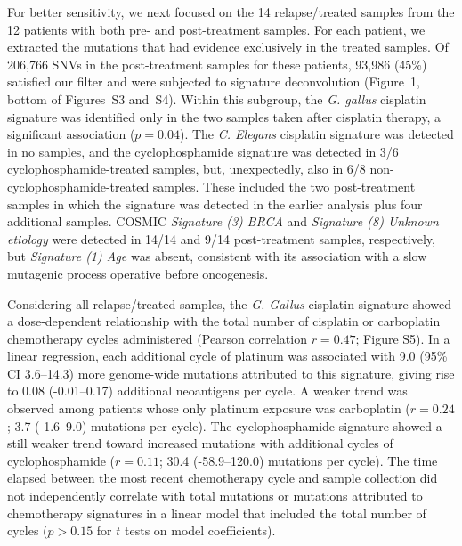 \documentclass[linenumbers]{bmcart}
\begin{document}
For better sensitivity, we next focused on the 14 relapse/treated samples from the 12 patients with both pre- and post-treatment samples. For each patient, we extracted the mutations that had evidence exclusively in the treated samples. Of 206,766 SNVs in the post-treatment samples for these patients, 93,986 (45\%) satisfied our filter and were subjected to signature deconvolution (Figure~1, bottom of Figures~S3 and~S4). Within this subgroup, the \textit{G. gallus} cisplatin signature was identified only in the two samples taken after cisplatin therapy, a significant association ($p = 0.04$). The \textit{C. Elegans} cisplatin signature was detected in no samples, and the cyclophosphamide signature was detected in 3/6 cyclophosphamide-treated samples, but, unexpectedly, also in 6/8 non-cyclophosphamide-treated samples. These included the two post-treatment samples in which the signature was detected in the earlier analysis plus four additional samples. COSMIC \textit{Signature (3) BRCA} and \textit{Signature (8) Unknown etiology} were detected in 14/14 and 9/14 post-treatment samples, respectively, but \textit{Signature (1) Age} was absent, consistent with its association with a slow mutagenic process operative before oncogenesis.

Considering all relapse/treated samples, the \textit{G. Gallus} cisplatin signature showed a dose-dependent relationship with the total number of cisplatin or carboplatin chemotherapy cycles administered (Pearson correlation $r=0.47$; Figure S5). In a linear regression, each additional cycle of platinum was associated with 9.0 (95\% CI 3.6--14.3) more genome-wide mutations attributed to this signature, giving rise to 0.08 (-0.01--0.17) additional neoantigens per cycle. A weaker trend was observed among patients whose only platinum exposure was carboplatin ($r=0.24$; 3.7 (-1.6--9.0) mutations per cycle). The cyclophosphamide signature showed a still weaker trend toward increased mutations with additional cycles of cyclophosphamide ($r=0.11$; 30.4 (-58.9--120.0) mutations per cycle). The time elapsed between the most recent chemotherapy cycle and sample collection did not independently correlate with total mutations or mutations attributed to chemotherapy signatures in a linear model that included the total number of cycles ($p > 0.15$ for $t$ tests on model coefficients).

\end{document}
